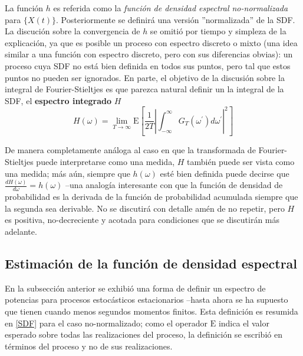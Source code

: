 \documentclass[12pt,a4paper]{mitthesis}
\newcommand{\intR}{\int_{-\infty}^{\infty}}
\newcommand{\prima}{^{\prime}}
\newcommand{\E}[1]{\mathrm{E}\left[ #1 \right]}
\begin{document}
La funci\'on $h$ es referida como la \textit{funci\'on de densidad espectral no-normalizada} para
$\{X(t)\}$. Posteriormente se definir\'a una versi\'on ''normalizada'' de la SDF.
La discuci\'on sobre la convergencia de $h$ se omiti\'o por tiempo y simpleza de la explicaci\'on,
ya que es posible un proceso con espectro discreto o mixto (una idea similar a una funci\'on con 
espectro discreto, pero con sus diferencias obvias): un proceso cuya SDF no est\'a bien definida en 
todos sus puntos, pero tal que estos puntos no pueden ser ignorados.
En parte, el objetivo de la discusi\'on sobre la integral de Fourier-Stieltjes es que parezca 
natural definir un la integral de la SDF, el \textbf{espectro integrado} $H$
\begin{equation*}
H(\omega) = \lim_{T\rightarrow \infty} 
\E{ \frac{1}{2 T} \left| \intR G_T(\omega\prima) d\omega\prima \right|^{2} }
\end{equation*}

De manera completamente an\'aloga al caso en que la transformada de Fourier-Stieltjes puede
interpretarse como una medida, $H$ tambi\'en puede ser vista como una medida; m\'as a\'un, siempre 
que $h(\omega)$ est\'e bien definida puede decirse que $\frac{dH(\omega)}{d\omega}= h(\omega)$ 
--una analog\'ia interesante con que la funci\'on de densidad de probabilidad es la derivada de la 
funci\'on de probabilidad acumulada siempre que la segunda sea derivable.
No se discutir\'a con detalle am\'en de no repetir, pero $H$ es positiva, no-decreciente y acotada 
para condiciones que se discutir\'an m\'as adelante.


\subsection{Estimaci\'on de la funci\'on de densidad espectral}

En la subsecci\'on anterior se exhibi\'o una forma de definir un espectro de potencias para 
procesos estoc\'asticos estacionarios --hasta ahora se ha supuesto que tienen cuando menos segundos 
momentos finitos. Esta definici\'on es resumida en \ref{SDF} para el caso no-normalizado; como el 
operador $\mathrm{E}$ indica el valor esperado sobre todas las realizaciones del proceso, la 
definici\'on se escribi\'o en t\'erminos del proceso y no de sus realizaciones.
\end{document}
